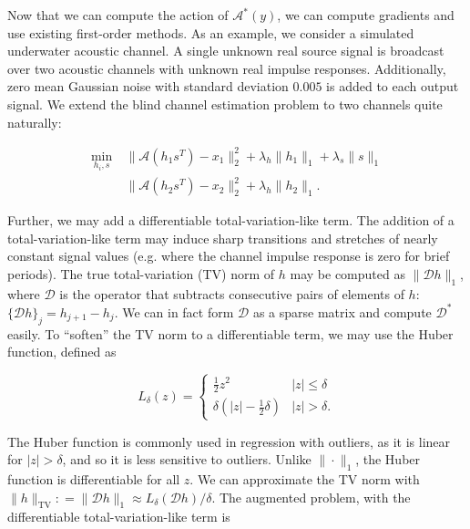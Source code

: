 \documentclass[journal]{IEEEtran}
\newcommand{\defeq}{\mathrel{\mathop:}=}
\begin{document}
Now that we can compute the action of $\mathcal{A}^\ast(y)$, we can compute gradients and use existing first-order methods.  As an example, we consider a simulated underwater acoustic channel.  A single unknown real source signal is broadcast over two acoustic channels with unknown real impulse responses.  Additionally, zero mean Gaussian noise with standard deviation $0.005$ is added to each output signal.  We extend the blind channel estimation problem to two channels quite naturally:

\begin{align*}
   \min_{h_i,s} ~&\|\mathcal{A}(h_1s^T) - x_1\|_2^2 + \lambda_{h}\|h_1\|_1 + \lambda_s\|s\|_1\\
                 &\|\mathcal{A}(h_2s^T) - x_2\|_2^2 + \lambda_{h}\|h_2\|_1.
\end{align*}

\noindent Further, we may add a differentiable total-variation-like term.  The addition of a total-variation-like term may induce sharp transitions and stretches of nearly constant signal values (e.g. where the channel impulse response is zero for brief periods).  The true total-variation (TV) norm of $h$ may be computed as $\|\mathcal{D}h\|_1$, where $\mathcal{D}$ is the operator that subtracts consecutive pairs of elements of $h$: $\{\mathcal{D}h\}_j = h_{j+1} - h_j$.  We can in fact form $\mathcal{D}$ as a sparse matrix and compute $\mathcal{D}^\ast$ easily.  To ``soften'' the TV norm to a differentiable term, we may use the Huber function, defined as

\[ L_\delta(z) = \left\{\begin{array}{ll} \frac{1}{2}z^2 & |z| \le \delta\\ \delta\left(|z| - \frac{1}{2}\delta\right) & |z| > \delta. \end{array}\right. \] 

\noindent The Huber function is commonly used in regression with outliers, as it is linear for $|z|>\delta$, and so it is less sensitive to outliers.  Unlike $\|\cdot\|_1$, the Huber function is differentiable for all $z$.  We can approximate the TV norm with ${\|h\|_\text{TV} \defeq\|\mathcal{D}h\|_1 \approx L_\delta(\mathcal{D}h)/\delta}$.  The augmented problem, with the differentiable total-variation-like term is
\end{document}
